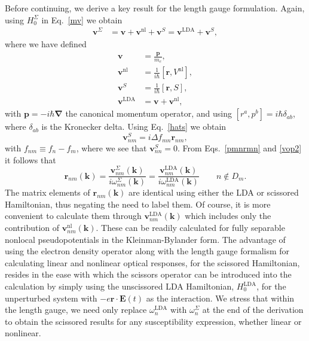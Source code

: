 \documentclass[floatfix,prb,aps,superscriptaddress,showpacs,11pt,preprint,letterpaper]{revtex4}
\begin{document}
Before continuing,
we derive a key result for the length gauge formulation. 
Again, using $H^\Sigma_0$ in
Eq.~\eqref{mv} we obtain
\begin{align}
\mathbf{v}^\Sigma&=
\mathbf{v} 
+
\mathbf{v}^\mathrm{nl} 
+\mathbf{v}^S
=
\mathbf{v}^\mathrm{LDA} 
+\mathbf{v}^S 
,
\label{vop2}
\end{align}
where we have defined 
\begin{align}
\mathbf{v} 
&=\frac{\mathbf{p}}{m_e},
\nonumber\\
\mathbf{v}^\mathrm{nl} 
&=
\frac{1}{i\hbar}[\mathbf{r},V^\mathrm{nl}],\label{vnl}
\\
\mathbf{v}^S
&=
\frac{1}{i\hbar}[\mathbf{r}, S],
\nonumber\\
\mathbf{v}^\mathrm{LDA} 
&=
\mathbf{v} 
+\mathbf{v}^\mathrm{nl}
,\nonumber
\end{align}  
with $\mathbf{p}=-i\hbar\boldsymbol{\nabla}$ the canonical momentum operator, 
and using $[r^a,p^b]=i\hbar\delta_{ab}$, where $\delta_{ab}$ is the 
Kronecker delta.
Using Eq.~\eqref{hats} we obtain 
\begin{equation}
\mathbf{v}^S_{nm}=i\Delta f_{mn}\mathbf{r}_{nm},
\label{chon.2} 
\end{equation}
with $f_{nm}\equiv f_n-f_m$,
where we see that $\mathbf{v}^S_{nn}=0$. From Eqs.~\eqref{pmnrmn} and
\eqref{vop2} it follows that
\begin{equation}
\mathbf{r}_{nm}(\mathbf{k}) 
=
\frac{\mathbf{v}^\Sigma_{nm}(\mathbf{k})}{i\omega^\Sigma_{nm}(\mathbf{k})}
=
\frac{\mathbf{v}^\mathrm{LDA}_{nm}(\mathbf{k})}{i\omega^\mathrm{LDA}_{nm}(\mathbf{k})}
\quad\quad n\notin D_m 
. 
\label{chon.10}
\end{equation}
The matrix elements 
of $\mathbf{r}_{nm}(\mathbf{k})$ are identical using either
the LDA or scissored
Hamiltonian, thus negating the need to label them.
Of course, it is more convenient to calculate them
through $\mathbf{v}^\mathrm{LDA}_{nm}(\mathbf{k})$ which 
includes only the contribution of 
$\mathbf{v}^\mathrm{nl}_{nm}(\mathbf{k})$. These can be readily
calculated
for 
fully separable nonlocal pseudopotentials in the 
Kleinman-Bylander 
form.\cite{olevanoPC,mottaCMS10,kleinmanPRL82,adolphPRB96}
The advantage of using the electron density operator along with 
the length gauge formalism for 
calculating linear and nonlinear optical responses,
for the scissored Hamiltonian,
resides in the ease with which the scissors operator
can be introduced into the calculation
by simply using the unscissored LDA Hamiltonian,
$H_0^{\mathrm{LDA}}$,
for the unperturbed system 
with $-e\mathbf{r}\cdot \mathbf{E}(t)$ as the interaction.
We stress that within the length gauge,
we need only replace $\omega^{\mathrm{LDA}}_{n}$ with 
$\omega_{n}^{\Sigma}$ at the end of the derivation
to obtain the scissored results for any 
susceptibility expression, whether linear or nonlinear.\cite{nastosPRB05} 
\end{document}
